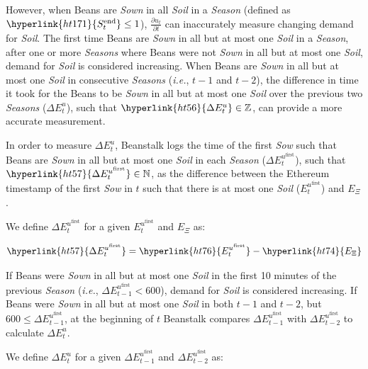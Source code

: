 \documentclass[tikz]{article}
\newcommand{\term}[1]{\textsl{#1}}
\begin{document}
However, when Beans are \term{Sown} in all \term{Soil} in a \term{Season} (defined as $\hyperlink{ht171}{S_t^{\text{end}}} \leq 1$), $\frac{\partial u_t}{\partial t}$ can inaccurately measure changing demand for \term{Soil}. The first time Beans are \term{Sown} in all but at most one \term{Soil} in a \term{Season}, after one or more \term{Seasons} where Beans were not \term{Sown} in all but at most one \term{Soil}, demand for \term{Soil} is considered increasing. When Beans are \term{Sown} in all but at most one \term{Soil} in consecutive \term{Seasons} (\term{i.e.}, $t-1$ and $t-2$), the difference in time it took for the Beans to be \term{Sown} in all but at most one \term{Soil} over the previous two \term{Seasons} (\hyperlink{ht56}{$\Delta E_{t}^{u}$}), such that $\hyperlink{ht56}{\Delta E_{t}^{u}} \in \mathbb{Z}$, can provide a more accurate measurement. 

In order to measure \hyperlink{ht56}{$\Delta E_{t}^{u}$}, Beanstalk logs the time of the first \term{Sow} such that Beans are \term{Sown} in all but at most one \term{Soil} in each \term{Season} (\hyperlink{ht57}{$\Delta E_{t}^{u^{\text{first}}}$}), such that $\hyperlink{ht57}{\Delta E_{t}^{u^{\text{first}}}} \in \mathbb{N}$, as the difference between the Ethereum timestamp of the first \term{Sow} in \hyperlink{ht204}{$t$} such that there is at most one \term{Soil} (\hyperlink{ht76}{$E_{t}^{u^{\text{first}}}$}) and \hyperlink{ht74}{$E_\Xi$}. 

We define \hyperlink{ht57}{$\Delta E_{t}^{u^{\text{first}}}$} for a given \hyperlink{ht76}{$E_{t}^{u^{\text{first}}}$} and \hyperlink{ht74}{$E_\Xi$} as:

    $$
        \hyperlink{ht57}{\Delta E_{t}^{u^{\text{first}}}} = 
            \hyperlink{ht76}{E_{t}^{u^{\text{first}}}} - \hyperlink{ht74}{E_\Xi}
    $$

If Beans were \term{Sown} in all but at most one \term{Soil} in the first 10 minutes of the previous \term{Season} (\term{i.e.}, $\Delta E_{t-1}^{u^{\text{first}}} < 600$), demand for \term{Soil} is considered increasing. If Beans were \term{Sown} in all but at most one \term{Soil} in both $t-1$ and $t-2$, but $600 \leq \Delta E_{t-1}^{u^{\text{first}}}$, at the beginning of \hyperlink{ht204}{$t$} Beanstalk compares $\Delta E_{t-1}^{u^{\text{first}}}$ with $\Delta E_{t-2}^{u^{\text{first}}}$ to calculate \hyperlink{ht56}{$\Delta E_{t}^{u}$}.

We define \hyperlink{ht56}{$\Delta E_{t}^{u}$} for a given $\Delta E_{t-1}^{u^{\text{first}}}$ and $\Delta E_{t-2}^{u^{\text{first}}}$ as:
\end{document}
